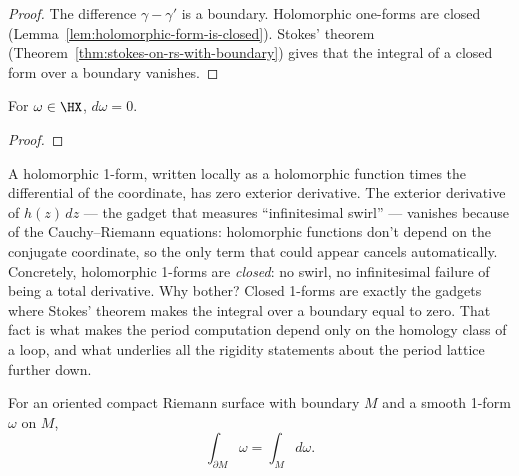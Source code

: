 \begin{proof}
The difference \(\gamma-\gamma'\) is a boundary. Holomorphic one-forms are
closed (Lemma~\ref{lem:holomorphic-form-is-closed}). Stokes' theorem
(Theorem~\ref{thm:stokes-on-rs-with-boundary}) gives that the integral of
a closed form over a boundary vanishes.
\end{proof}

\begin{lemma}
\label{lem:holomorphic-form-is-closed}
For \(\omega\in\HX\), \(d\omega=0\).
\leanok
\end{lemma}
\begin{proof}\leanok\end{proof}

\begin{layman}
A holomorphic 1-form, written locally as a holomorphic function times the
differential of the coordinate, has zero exterior derivative. The
exterior derivative of \(h(z)\,dz\) — the gadget that measures
``infinitesimal swirl'' — vanishes because of the Cauchy–Riemann
equations: holomorphic functions don't depend on the conjugate
coordinate, so the only term that could appear cancels automatically.
Concretely, holomorphic 1-forms are \emph{closed}: no swirl, no
infinitesimal failure of being a total derivative. Why bother? Closed
1-forms are exactly the gadgets where Stokes' theorem makes the integral
over a boundary equal to zero. That fact is what makes the period
computation depend only on the homology class of a loop, and what
underlies all the rigidity statements about the period lattice further
down.
\end{layman}

\begin{theorem}
\label{thm:stokes-on-rs-with-boundary}
For an oriented compact Riemann surface with boundary \(M\) and a smooth
1-form \(\omega\) on \(M\),
\[
  \int_{\partial M}\omega = \int_{M} d\omega.
\]
\leanok
\end{theorem}

